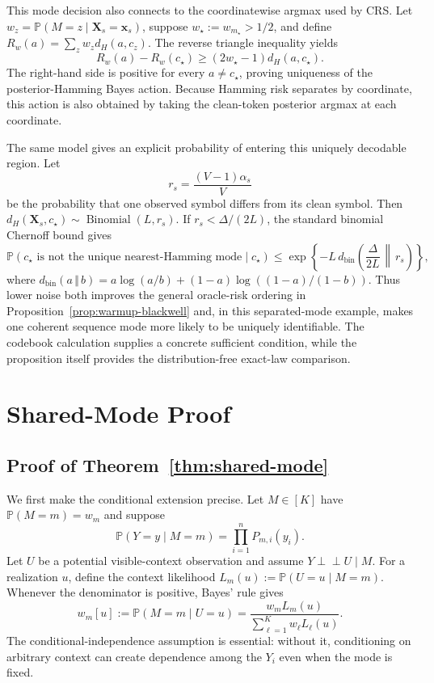 \documentclass{article}
\newcommand{\1}{\mathbf 1}
\newcommand{\CRS}{\textsc{CRS}}
\theoremstyle{definition}
\begin{document}
This mode decision also connects to the coordinatewise argmax used by
\CRS{}. Let $w_z=\mathbb P(M=z\mid\bm X_s=\bm x_s)$, suppose
$w_\star:=w_{m_\star}>1/2$, and define
$R_w(a)=\sum_z w_zd_H(a,c_z)$. The reverse triangle inequality yields
\begin{equation}
 R_w(a)-R_w(c_\star)
 \ge(2w_\star-1)d_H(a,c_\star).
 \label{eq:hamming-bayes-gap-app}
\end{equation}
The right-hand side is positive for every $a\ne c_\star$, proving uniqueness
of the posterior-Hamming Bayes action. Because Hamming risk separates by
coordinate, this action is also obtained by taking the clean-token posterior
argmax at each coordinate.

The same model gives an explicit probability of entering this uniquely
decodable region. Let
\[
 r_s=\frac{(V-1)\alpha_s}{V}
\]
be the probability that one observed symbol differs from its clean symbol.
Then $d_H(\bm X_s,c_\star)\sim\operatorname{Binomial}(L,r_s)$. If
$r_s<\Delta/(2L)$, the standard binomial Chernoff bound gives
\begin{equation}
 \mathbb P\!\left(
 c_\star\text{ is not the unique nearest-Hamming mode}
 \mid c_\star
 \right)
 \le
 \exp\!\left\{
 -L\,d_{\mathrm{bin}}\!\left(
 \frac{\Delta}{2L}\,\middle\Vert\,r_s
 \right)
 \right\},
 \label{eq:warmup-codebook-bound-app}
\end{equation}
where
$d_{\mathrm{bin}}(a\,\Vert\,b)
=a\log(a/b)+(1-a)\log((1-a)/(1-b))$.
Thus lower noise both improves the general oracle-risk ordering in
Proposition~\ref{prop:warmup-blackwell} and, in this separated-mode example,
makes one coherent sequence mode more likely to be uniquely identifiable.
The codebook calculation supplies a concrete sufficient condition, while the
proposition itself provides the distribution-free exact-law comparison.

\FloatBarrier

\section{Shared-Mode Proof}
\label{app:shared-mode-proof}

\subsection{Proof of Theorem~\ref{thm:shared-mode}}
\label{app:shared-mode-theorem-proof}

We first make the conditional extension precise. Let $M\in[K]$ have
$\mathbb P(M=m)=w_m$ and suppose
\[
 \mathbb P(Y=y\mid M=m)
 =\prod_{i=1}^nP_{m,i}(y_i).
\]
Let $U$ be a potential visible-context observation and assume
$Y\perp\!\!\!\perp U\mid M$. For a realization $u$, define the context
likelihood $L_m(u):=\mathbb P(U=u\mid M=m)$. Whenever the denominator is
positive, Bayes' rule gives
\begin{equation}
 w_m[u]:=\mathbb P(M=m\mid U=u)
 =\frac{w_mL_m(u)}{\sum_{\ell=1}^K w_\ell L_\ell(u)}.
 \label{eq:context-posterior-weights-app}
\end{equation}
The conditional-independence assumption is essential: without it,
conditioning on arbitrary context can create dependence among the $Y_i$ even
when the mode is fixed.
\end{document}
